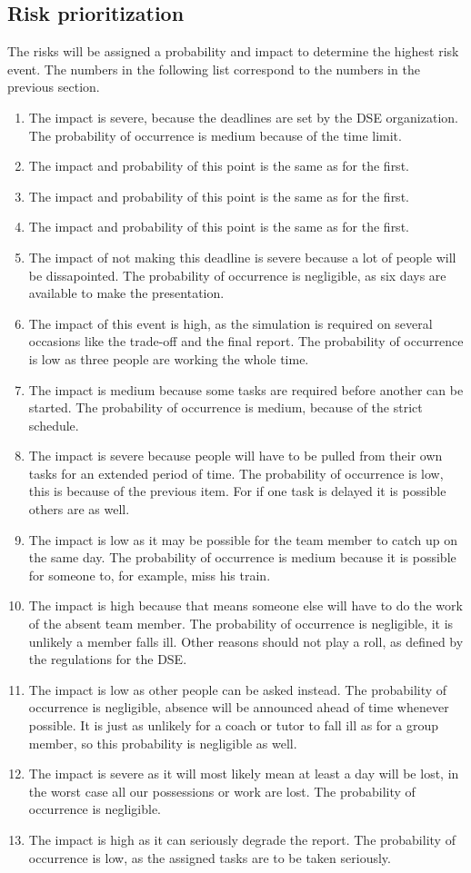 \subsection{Risk prioritization}
The risks will be assigned a probability and impact to determine the highest risk event. The numbers in the following list correspond to the numbers in the previous section.
\begin{enumerate}
	\item The impact is severe, because the deadlines are set by the DSE organization. The probability of occurrence is medium because of the time limit.
	\item The impact and probability of this point is the same as for the first.
	\item The impact and probability of this point is the same as for the first.
	\item The impact and probability of this point is the same as for the first.
	\item The impact of not making this deadline is severe because a lot of people will be dissapointed. The probability of occurrence is negligible, as six days are available to make the presentation.
	\item The impact of this event is high, as the simulation is required on several occasions like the trade-off and the final report. The probability of occurrence is low as three people are working the whole time.
	\item The impact is medium because some tasks are required before another can be started. The probability of occurrence is medium, because of the strict schedule.
	\item The impact is severe because people will have to be pulled from their own tasks for an extended period of time. The probability of occurrence is low, this is because of the previous item. For if one task is delayed it is possible others are as well.
	\item The impact is low as it may be possible for the team member to catch up on the same day. The probability of occurrence is medium because it is possible for someone to, for example, miss his train.
	\item The impact is high because that means someone else will have to do the work of the absent team member. The probability of occurrence is negligible, it is unlikely a member falls ill. Other reasons should not play a roll, as defined by the regulations for the DSE.
	\item The impact is low as other people can be asked instead. The probability of occurrence is negligible, absence will be announced ahead of time whenever possible. It is just as unlikely for a coach or tutor to fall ill as for a group member, so this probability is negligible as well.
	\item The impact is severe as it will most likely mean at least a day will be lost, in the worst case all our possessions or work are lost. The probability of occurrence is negligible.
	\item The impact is high as it can seriously degrade the report. The probability of occurrence is low, as the assigned tasks are to be taken seriously.
\end{enumerate}

